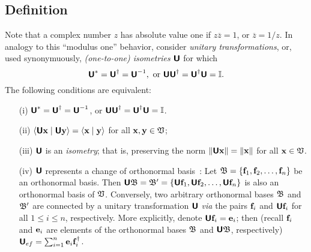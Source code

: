 \subsection {Definition}
Note that a complex number $z$ has absolute value one if $z\overline{z}=1$, or $\overline{z}=1/z$.
In analogy to this ``modulus one'' behavior,
consider {\em unitary transformations}, or, used synonymuously, {\em (one-to-one) isometries}
$\textsf{\textbf{U}}$ for which
\begin{equation}
\textsf{\textbf{U}}^\ast = \textsf{\textbf{U}}^\dagger =\textsf{\textbf{U}}^{-1},
\textrm{ or } \textsf{\textbf{U}}\textsf{\textbf{U}}^\dagger =\textsf{\textbf{U}}^\dagger \textsf{\textbf{U}}={\Bbb I}.
\end{equation}
The following conditions are equivalent:
\begin{itemize}
\item[(i)]
$\textsf{\textbf{U}}^\ast = \textsf{\textbf{U}}^\dagger =\textsf{\textbf{U}}^{-1}$,
or $\textsf{\textbf{U}}\textsf{\textbf{U}}^\dagger =\textsf{\textbf{U}}^\dagger \textsf{\textbf{U}}={\Bbb I}$.
\item[(ii)]
$\langle \textsf{\textbf{U}}{\bf x}\mid \textsf{\textbf{U}}{\bf y} \rangle
=
\langle {\bf x}\mid {\bf y} \rangle$ for all ${\bf x} ,{\bf y} \in {\frak V}$;
\item[(iii)]  $\textsf{\textbf{U}}$ is an {\em isometry};
that is, preserving the norm
$\| \textsf{\textbf{U}}{\bf x}\|
=
\|{\bf x}\|$ for all ${\bf x}  \in {\frak V}$.
\item[(iv)]
$\textsf{\textbf{U}}$ represents a change of orthonormal basis~\cite{Schwinger.60}:
Let ${\frak B}=\{{\bf f}_1,  {\bf f}_2, \ldots , {\bf f}_n\}$
be an orthonormal basis.
Then
$\textsf{\textbf{U}}{\frak B}={\frak B}'=\{\textsf{\textbf{U}}{\bf f}_1, \textsf{\textbf{U}} {\bf f}_2,
\ldots ,\textsf{\textbf{U}} {\bf f}_n\}$
is also an orthonormal basis of  ${\frak V}$.
Conversely, two arbitrary orthonormal bases
${\frak B}$
and
${\frak B}'$
are connected by a unitary transformation $\textsf{\textbf{U}}$ {\it via} the pairs  ${\bf f}_i$ and $ \textsf{\textbf{U}}{\bf f}_i$
for all $1\le i \le n$, respectively.
More explicitly, denote  $\textsf{\textbf{U}} {\bf f}_i   = {\bf e}_i$; then
(recall ${\bf f}_i$ and ${\bf e}_i$ are elements of the orthonormal bases
$  {\frak B} $  and $ \textsf{\textbf{U}} {\frak B} $, respectively)
$\textsf{\textbf{U}}_{ef}   = \sum_{i=1}^n{\bf e}_i  {\bf f}_i^\dagger$.
\end{itemize}

